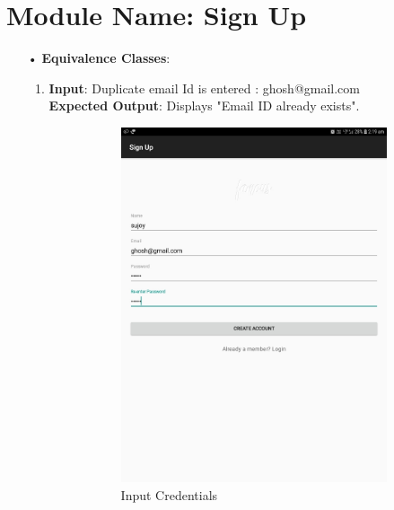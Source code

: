 \documentclass{scrreprt}
\begin{document}
\section{Module Name: Sign Up}
\begin{itemize}
\item[•]\textbf{Equivalence Classes}:
\begin{enumerate}
\item \textbf{Input}: Duplicate email Id is entered : ghosh@gmail.com \\
\textbf{Expected Output}: Displays "Email ID already exists".
\begin{figure}[H]
\begin{subfigure}{0.5\textwidth}
\includegraphics[width=0.85\linewidth, keepaspectratio]{signupexistemail.jpg} 
\caption{Input Credentials}
\label{fig:subim1}
\end{subfigure}
\begin{subfigure}{0.5\textwidth}

\end{subfigure}
\end{figure}
\end{enumerate}
\end{itemize}
\end{document}
